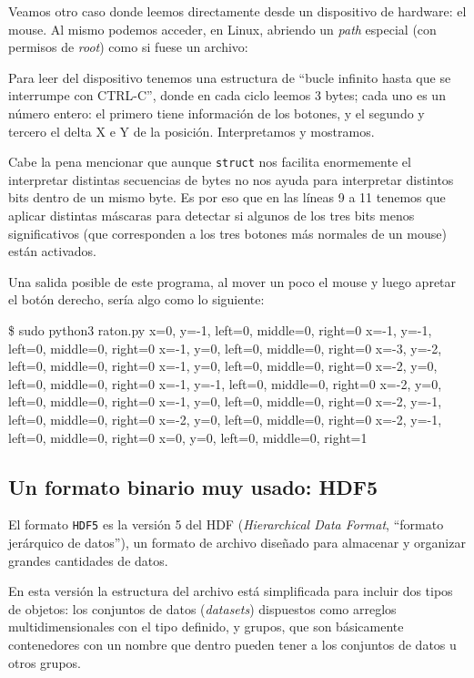 Veamos otro caso donde leemos directamente desde un dispositivo de hardware: el mouse. Al mismo podemos acceder, en Linux, abriendo un \textit{path} especial (con permisos de \textit{root}) como si fuese un archivo:


Para leer del dispositivo tenemos una estructura de ``bucle infinito hasta que se interrumpe con CTRL-C'', donde en cada ciclo leemos 3 bytes; cada uno es un número entero: el primero tiene información de los botones, y el segundo y tercero el delta X e Y de la posición. Interpretamos y mostramos.

Cabe la pena mencionar que aunque \texttt{struct} nos facilita enormemente el interpretar distintas secuencias de bytes no nos ayuda para interpretar distintos bits dentro de un mismo byte. Es por eso que en las líneas 9 a 11 tenemos que aplicar distintas máscaras para detectar si algunos de los tres bits menos significativos (que corresponden a los tres botones más normales de un mouse) están activados.

Una salida posible de este programa, al mover un poco el mouse y luego apretar el botón derecho, sería algo como lo siguiente:

\begin{shell}
\$ sudo python3 raton.py
x=0, y=-1, left=0, middle=0, right=0
x=-1, y=-1, left=0, middle=0, right=0
x=-1, y=0, left=0, middle=0, right=0
x=-3, y=-2, left=0, middle=0, right=0
x=-1, y=0, left=0, middle=0, right=0
x=-2, y=0, left=0, middle=0, right=0
x=-1, y=-1, left=0, middle=0, right=0
x=-2, y=0, left=0, middle=0, right=0
x=-1, y=0, left=0, middle=0, right=0
x=-2, y=-1, left=0, middle=0, right=0
x=-2, y=0, left=0, middle=0, right=0
x=-2, y=-1, left=0, middle=0, right=0
x=0, y=0, left=0, middle=0, right=1
\end{shell}


\subsection{Un formato binario muy usado: HDF5}

El formato \texttt{HDF5} es la versión 5 del HDF (\textit{Hierarchical Data Format}, ``formato jerárquico de datos''), un formato de archivo diseñado para almacenar y organizar grandes cantidades de datos.

En esta versión la estructura del archivo está simplificada para incluir dos tipos de objetos: los conjuntos de datos (\textit{datasets}) dispuestos como arreglos multidimensionales con el tipo definido, y grupos, que son básicamente contenedores con un nombre que dentro pueden tener a los conjuntos de datos u otros grupos.

